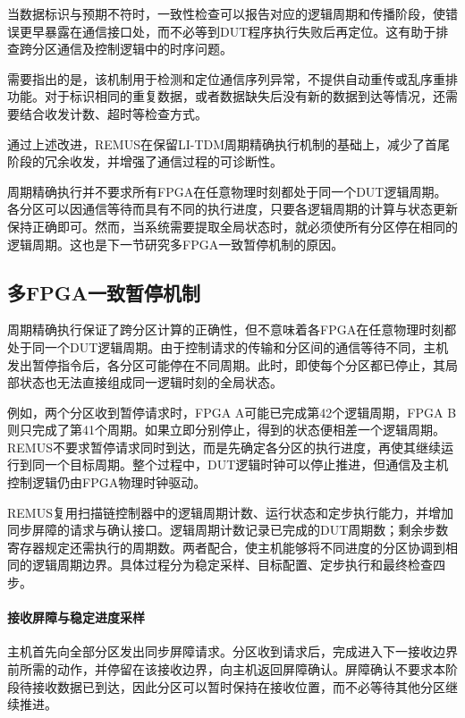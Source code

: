 当数据标识与预期不符时，一致性检查可以报告对应的逻辑周期和传播阶段，使错误更早暴露在通信接口处，而不必等到DUT程序执行失败后再定位。这有助于排查跨分区通信及控制逻辑中的时序问题。

需要指出的是，该机制用于检测和定位通信序列异常，不提供自动重传或乱序重排功能。对于标识相同的重复数据，或者数据缺失后没有新的数据到达等情况，还需要结合收发计数、超时等检查方式。

通过上述改进，REMUS在保留LI-TDM周期精确执行机制的基础上，减少了首尾阶段的冗余收发，并增强了通信过程的可诊断性。

周期精确执行并不要求所有FPGA在任意物理时刻都处于同一个DUT逻辑周期。各分区可以因通信等待而具有不同的执行进度，只要各逻辑周期的计算与状态更新保持正确即可。然而，当系统需要提取全局状态时，就必须使所有分区停在相同的逻辑周期。这也是下一节研究多FPGA一致暂停机制的原因。

\subsection{多FPGA一致暂停机制}
\label{sec:midterm-global-pause}

周期精确执行保证了跨分区计算的正确性，但不意味着各FPGA在任意物理时刻都处于同一个DUT逻辑周期。由于控制请求的传输和分区间的通信等待不同，主机发出暂停指令后，各分区可能停在不同周期。此时，即使每个分区都已停止，其局部状态也无法直接组成同一逻辑时刻的全局状态。

例如，两个分区收到暂停请求时，FPGA A可能已完成第42个逻辑周期，FPGA B则只完成了第41个周期。如果立即分别停止，得到的状态便相差一个逻辑周期。REMUS不要求暂停请求同时到达，而是先确定各分区的执行进度，再使其继续运行到同一个目标周期。整个过程中，DUT逻辑时钟可以停止推进，但通信及主机控制逻辑仍由FPGA物理时钟驱动。

REMUS复用扫描链控制器中的逻辑周期计数、运行状态和定步执行能力，并增加同步屏障的请求与确认接口。逻辑周期计数记录已完成的DUT周期数；剩余步数寄存器规定还需执行的周期数。两者配合，使主机能够将不同进度的分区协调到相同的逻辑周期边界。具体过程分为稳定采样、目标配置、定步执行和最终检查四步。

\paragraph{接收屏障与稳定进度采样}

主机首先向全部分区发出同步屏障请求。分区收到请求后，完成进入下一接收边界前所需的动作，并停留在该接收边界，向主机返回屏障确认。屏障确认不要求本阶段待接收数据已到达，因此分区可以暂时保持在接收位置，而不必等待其他分区继续推进。

